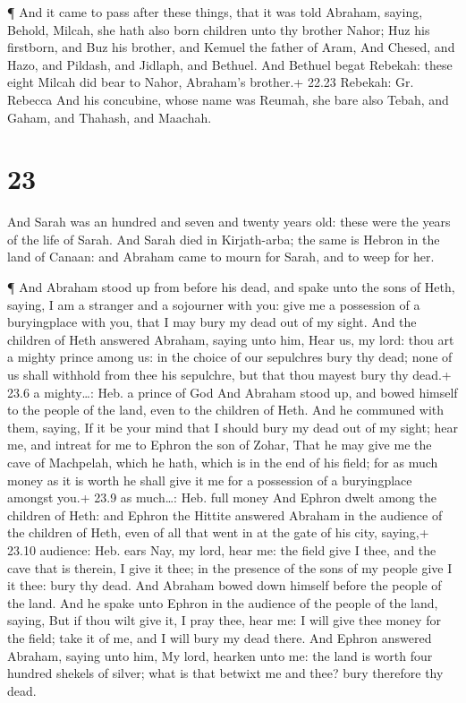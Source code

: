  ¶ And it came to pass after these things, that it was told
Abraham, saying, Behold, Milcah, she hath also born children unto thy
brother Nahor;  Huz his firstborn, and Buz his brother, and
Kemuel the father of Aram,  And Chesed, and Hazo, and
Pildash, and Jidlaph, and Bethuel.  And Bethuel begat
Rebekah: these eight Milcah did bear to Nahor, Abraham's brother.+ 22.23
Rebekah: Gr. Rebecca  And his concubine, whose name was
Reumah, she bare also Tebah, and Gaham, and Thahash, and Maachah.

\hypertarget{section-22}{%
\section{23}\label{section-22}}

 And Sarah was an hundred and seven and twenty years old:
these were the years of the life of Sarah.  And Sarah died
in Kirjath-arba; the same is Hebron in the land of Canaan: and Abraham
came to mourn for Sarah, and to weep for her.

 ¶ And Abraham stood up from before his dead, and spake unto
the sons of Heth, saying,  I am a stranger and a sojourner
with you: give me a possession of a buryingplace with you, that I may
bury my dead out of my sight.  And the children of Heth
answered Abraham, saying unto him,  Hear us, my lord: thou
art a mighty prince among us: in the choice of our sepulchres bury thy
dead; none of us shall withhold from thee his sepulchre, but that thou
mayest bury thy dead.+ 23.6 a mighty\ldots: Heb. a prince of God
 And Abraham stood up, and bowed himself to the people of
the land, even to the children of Heth.  And he communed
with them, saying, If it be your mind that I should bury my dead out of
my sight; hear me, and intreat for me to Ephron the son of Zohar,
 That he may give me the cave of Machpelah, which he hath,
which is in the end of his field; for as much money as it is worth he
shall give it me for a possession of a buryingplace amongst you.+ 23.9
as much\ldots: Heb. full money  And Ephron dwelt among the
children of Heth: and Ephron the Hittite answered Abraham in the
audience of the children of Heth, even of all that went in at the gate
of his city, saying,+ 23.10 audience: Heb. ears  Nay, my
lord, hear me: the field give I thee, and the cave that is therein, I
give it thee; in the presence of the sons of my people give I it thee:
bury thy dead.  And Abraham bowed down himself before the
people of the land.  And he spake unto Ephron in the
audience of the people of the land, saying, But if thou wilt give it, I
pray thee, hear me: I will give thee money for the field; take it of me,
and I will bury my dead there.  And Ephron answered
Abraham, saying unto him,  My lord, hearken unto me: the
land is worth four hundred shekels of silver; what is that betwixt me
and thee? bury therefore thy dead.

